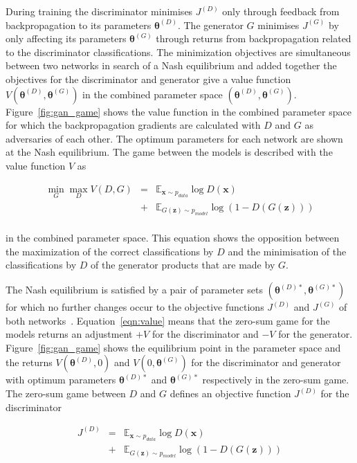 \documentclass[twocolumn]{article}
\numberwithin{equation}{section}
\begin{document}
During training the discriminator minimises $J^{(D)}$ only through feedback from backpropagation to its parameters 
$\bm{\theta}^{(D)}$. The generator $G$ minimises $J^{(G)}$ by only affecting its parameters $\bm{\theta}^{(G)}$ through 
returns from backpropagation related to the discriminator classifications. The minimization objectives are simultaneous 
between two networks in search of a Nash equilibrium and added together the objectives for the discriminator and generator 
give a value function $V(\bm{\theta}^{(D)}, \bm{\theta}^{(G)})$ in the combined parameter space $(\bm{\theta}^{(D)}, 
\bm{\theta}^{(G)})$. Figure~\ref{fig:gan_game} shows the value function in the combined parameter space for which the 
backpropagation gradients are calculated with $D$ and $G$ as adversaries of each other. The optimum parameters for each 
network are shown at the Nash equilibrium. The game between the models is described with the value function $V$ as 

\begin{eqnarray}\label{eqn:value}
    \min_G \max_D V(D,G) &=& \mathbb{E}_{\mathbf{x}\sim p_{data}}\log D(\mathbf{x})            \nonumber \\
                         &+& \mathbb{E}_{G(\mathbf{z}) \sim p_{model}}\log(1-D(G(\mathbf{z}))) \nonumber \\
\end{eqnarray}

in the combined parameter space. This equation shows the opposition between the maximization of the correct 
classifications by $D$ and the minimisation of the classifications by $D$ of the generator products that are made 
by $G$. 

The Nash equilibrium is satisfied by a pair of parameter sets $(\bm{\theta}^{(D)*}, \bm{\theta}^{(G)*})$ for which 
no further changes occur to the objective functions $J^{(D)}$ and $J^{(G)}$ of both networks~\cite{NIPS16}. 
Equation~\ref{eqn:value} means that the zero-sum game for the models returns an adjustment $+V$ for the discriminator 
and $-V$ for the generator. Figure~\ref{fig:gan_game} shows the equilibrium point in the parameter space and the 
returns $V(\bm{\theta}^{(D)}, 0)$ and $V(0, \bm{\theta}^{(G)})$ for the discriminator and generator with optimum 
parameters $\bm{\theta}^{(D)*}$ and $\bm{\theta}^{(G)*}$ respectively in the zero-sum game. The zero-sum game between 
$D$ and $G$ defines an objective function $J^{(D)}$ for the discriminator

\begin{eqnarray}\label{eq:J_D}
    J^{(D)} &=& \mathbb{E}_{\mathbf{x} \sim p_{data}}\log D(\mathbf{x})  \nonumber \\
            &+&\mathbb{E}_{G(\mathbf{z}) \sim p_{model}}\log (1 - D(G(\mathbf{z})))
\end{eqnarray}
\end{document}
